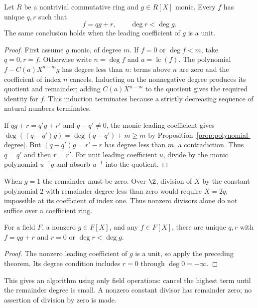 \begin{theorem}\label{thm:monic-polynomial-division}
Let $R$ be a nontrivial commutative ring and $g\in R[X]$ monic.
Every $f$ has unique $q,r$ such that
\[
 f=qg+r,\qquad \deg r<\deg g.
\]
The same conclusion holds when the leading coefficient of $g$ is a
unit.
\end{theorem}
\begin{proof}
First assume $g$ monic, of degree $m$. If $f=0$ or $\deg f<m$,
take $q=0,r=f$. Otherwise write $n=\deg f$ and $a=\operatorname{lc}(f)$.
The polynomial $f-C(a)X^{n-m}g$ has degree less than $n$: terms
above $n$ are zero and the coefficient of index $n$ cancels.
Inducting on the nonnegative degree produces its quotient and
remainder; adding $C(a)X^{n-m}$ to the quotient gives the required
identity for $f$. This induction terminates because a strictly
decreasing sequence of natural numbers terminates.

If $qg+r=q'g+r'$ and $q-q'\ne0$, the monic leading coefficient
gives
$\deg((q-q')g)=\deg(q-q')+m\ge m$ by
Proposition~\ref{prop:polynomial-degree}. But
$(q-q')g=r'-r$ has degree less than $m$, a contradiction.
Thus $q=q'$ and then $r=r'$.
For unit leading coefficient $u$, divide by the monic polynomial
$u^{-1}g$ and absorb $u^{-1}$ into the quotient.
\end{proof}
When $g=1$ the remainder must be zero. Over $\Z$, division of $X$
by the constant polynomial $2$ with remainder degree less than zero
would require $X=2q$, impossible at its coefficient of index one.
Thus nonzero divisors alone do not suffice over a coefficient ring.

\begin{corollary}\label{thm:polynomial-division}
For a field $F$, a nonzero $g\in F[X]$, and any $f\in F[X]$,
there are unique $q,r$ with $f=qg+r$ and
$r=0$ or $\deg r<\deg g$.
\end{corollary}
\begin{proof}
The nonzero leading coefficient of $g$ is a unit, so apply the preceding
theorem. Its degree condition includes $r=0$ through $\deg0=-\infty$.
\end{proof}
This gives an algorithm using only field operations: cancel the
highest term until the remainder degree is small. A nonzero constant
divisor has remainder zero; no assertion of division by zero is made.

